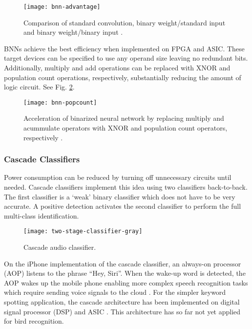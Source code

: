 \begin{figure}[h]
    \centering
    \texttt{[image: bnn-advantage]}
    \caption{Comparison of standard convolution, binary weight/standard input and binary weight/binary input \citep{Rastegari2016}.}
    \label{bnn-advantage}
\end{figure}

BNNs achieve the best efficiency when implemented on FPGA and ASIC. These target devices can be specified to use any operand size leaving no redundant bits. Additionally, multiply and add operations can be replaced with XNOR and population count operations, respectively, substantially reducing the amount of logic circuit.  See Fig. \ref{bnn-popcount}.

\begin{figure}[h]
    \centering
    \texttt{[image: bnn-popcount]}
    \caption{Acceleration of binarized neural network by replacing multiply and acummulate operators with XNOR and population count operators, respectively \citep{Rastegari2016}.}
    \label{bnn-popcount}
\end{figure}

\FloatBarrier

\subsubsection{Cascade Classifiers}

Power consumption can be reduced by turning off unnecessary circuits until needed.
Cascade classifiers implement this idea using two classifiers back-to-back.
The first classifier is a `weak' binary classifier which does not have to be very accurate.
A  positive detection activates the second classifier to perform the full multi-class identification.


\begin{figure}[H]
\centering
\texttt{[image: two-stage-classifier-gray]}
\caption{Cascade audio classifier.}
\label{two-stage-classifier-gray}
\end{figure}

On the iPhone implementation of the cascade classifier, an always-on processor (AOP) listens to the phrase ``Hey, Siri''.
When the wake-up word is detected, the AOP wakes up the mobile phone enabling more complex speech recognition tasks which require sending voice signals to the cloud \cite{Sigtia2018}.
For the simpler keyword spotting application, the cascade architecture has been implemented on digital signal processor (DSP) \citep{Gruenstein2017} and ASIC \cite{Price2018, Yin2018}.
This architecture has so far not yet applied for bird recognition.
		


